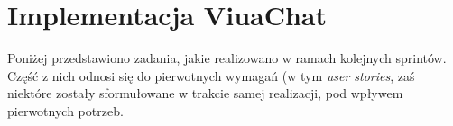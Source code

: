 \section{Implementacja ViuaChat}
 Poniżej przedstawiono zadania, jakie realizowano w ramach kolejnych
 sprintów. Część z nich odnosi się do pierwotnych wymagań (w tym
 \textit{user stories}, zaś niektóre zostały sformułowane w trakcie samej
 realizacji, pod wpływem pierwotnych potrzeb.















